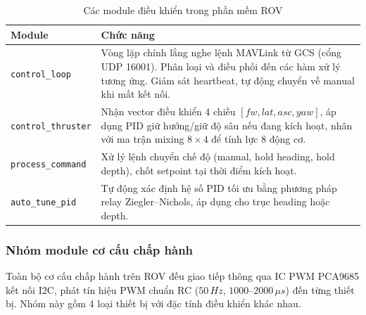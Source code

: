 \documentclass[../DoAn.tex]{subfiles}
\begin{document}
\begin{table}[H]

\centering

\renewcommand{\arraystretch}{1.3}

\begin{tabular}{|l|p{9cm}|}

\hline

\textbf{Module} & \textbf{Chức năng} \\

\hline

\texttt{control\_loop} &
Vòng lặp chính lắng nghe lệnh MAVLink từ GCS (cổng UDP 16001). Phân loại và điều phối đến các hàm xử lý tương ứng. Giám sát heartbeat, tự động chuyển về manual khi mất kết nối. \\

\hline

\texttt{control\_thruster} & Nhận vector điều khiển 4 chiều $[fw, lat, asc, yaw]$, áp dụng
PID giữ hướng/giữ độ sâu nếu đang kích hoạt, nhân với ma trận
mixing $8\times4$ để tính lực 8 động cơ. \\

\hline

\texttt{process\_command} &
Xử lý lệnh chuyển chế độ (manual, hold heading, hold depth),
chốt setpoint tại thời điểm kích hoạt. \\

\hline

\texttt{auto\_tune\_pid} &
Tự động xác định hệ số PID tối ưu bằng phương pháp relay
Ziegler--Nichols, áp dụng cho trục heading hoặc depth. \\

\hline

\end{tabular}

\caption{Các module điều khiển trong phần mềm ROV}

\label{tab:control_modules}

\end{table}

\subsubsection{Nhóm module cơ cấu chấp hành}

Toàn bộ cơ cấu chấp hành trên ROV đều giao tiếp thông qua IC PWM
PCA9685 kết nối I2C, phát tín hiệu PWM chuẩn RC ($50\,Hz$,
$1000$--$2000\,\mu s$) đến từng thiết bị. Nhóm này gồm 4 loại thiết
bị với đặc tính điều khiển khác nhau.
\end{document}
